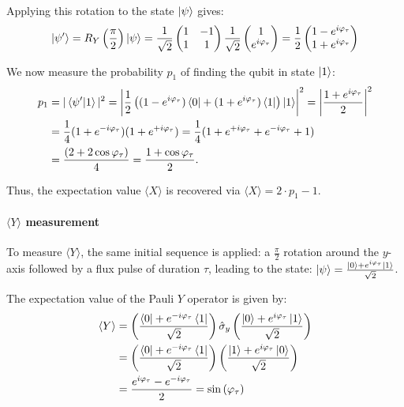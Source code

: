 Applying this rotation to the state $\ket{\psi}$ gives:
\begin{equation}
    \ket{\psi'} = R_Y\left(\frac{\pi}{2}\right) \ket{\psi} = \frac{1}{\sqrt{2}} 
\begin{pmatrix}
1 & -1 \\
1 & 1
\end{pmatrix}
\frac{1}{\sqrt{2}} 
\begin{pmatrix}
1 \\
e^{i\varphi_\tau}
\end{pmatrix}
= \frac{1}{2}
\begin{pmatrix}
1 - e^{i\varphi_\tau} \\
1 + e^{i\varphi_\tau}
\end{pmatrix}
\end{equation}

We now measure the probability $p_1$ of finding the qubit in state $\ket{1}$:
\begin{align}\label{eq:P1X}
    p_1 &= |\braket{\psi'|1}|^2 = \left| \frac{1}{2} \left( (1 - e^{i\varphi_\tau})\bra{0} + (1 + e^{i\varphi_\tau})\bra{1} \right) \ket{1} \right|^2 = \left| \frac{1 + e^{i\varphi_\tau}}{2} \right|^2\\
        &= \frac{1}{4} (1+e^{-i\varphi_\tau})(1+e^{+i\varphi_\tau}) = \frac{1}{4}(1 + e^{+i\varphi_\tau} + e^{-i\varphi_\tau} +1)\\ 
        &=\frac{(2+ 2\cos{\varphi_\tau})}{4} = \frac{1 + \cos{\varphi_\tau}}{2}.
\end{align}

Thus, the expectation value $\langle X \rangle$ is recovered via $\langle X \rangle = 2\cdot p_1 - 1$.

\paragraph{$\langle Y \rangle$ measurement}
To measure $\langle Y \rangle$, the same initial sequence is applied: a $\frac{\pi}{2}$ rotation around the $y$-axis followed by a flux pulse of duration $\tau$, leading to the state: $\ket{\psi}=\frac{\ket{0} + e^{i\varphi_\tau} \ket{1}}{\sqrt{2}}$.

The expectation value of the Pauli $Y$ operator is given by:
\begin{align}
    \langle Y \rangle &= \left( \frac{\bra{0} + e^{- i\varphi_\tau} \bra{1}}{\sqrt{2}} \right) \hat{\sigma}_y \left( \frac{\ket{0} + e^{ i \varphi_\tau} \ket{1}}{\sqrt{2}} \right)\\
    &= \left( \frac{\bra{0} + e^{- i \varphi_\tau} \bra{1}}{\sqrt{2}} \right) \left( \frac{\ket{1} + e^{ i \varphi_\tau} \ket{0}}{\sqrt{2}} \right)\\
    &= \frac{e^{ i \varphi_\tau} - e^{- i\varphi_\tau}}{2} = \sin{(\varphi_\tau)}
\end{align}

